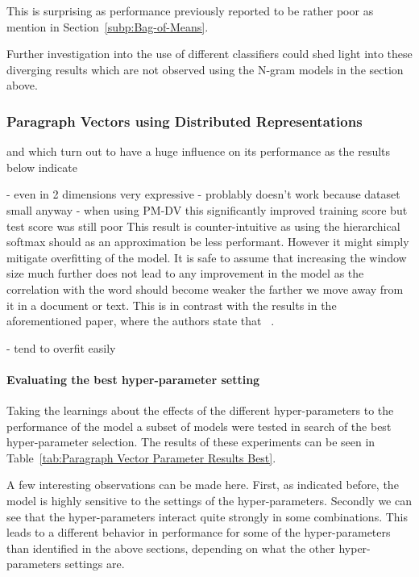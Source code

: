 This is surprising as performance previously reported to be rather poor as mention in Section~\ref{subp:Bag-of-Means}.

 Further investigation into the use of different classifiers could shed light into these diverging results which are not observed using the N-gram models in the section above.

\subsubsection{Paragraph Vectors using Distributed Representations}

and which turn out to have a huge influence on its performance as the results below indicate

- even in 2 dimensions very expressive
- problably doesn't work because dataset small anyway
- when using PM-DV this significantly improved training score but test score was still poor
This result is counter-intuitive as using the hierarchical softmax should as an approximation be less performant. However it might simply mitigate overfitting of the model.
It is safe to assume that increasing the window size much further does not lead to any improvement in the model as the correlation with the word should become weaker the farther we move away from it in a document or text.
This is in contrast with the results in the aforementioned paper, where the authors state that ~\cite{Le:2014aa}.

- tend to overfit easily




\paragraph{Evaluating the best hyper-parameter setting}

Taking the learnings about the effects of the different hyper-parameters to the performance of the model a subset of models were tested in search of the best hyper-parameter selection. The results of these experiments can be seen in Table~\ref{tab:Paragraph Vector Parameter Results Best}.

A few interesting observations can be made here. First, as indicated before, the model is highly sensitive to the settings of the hyper-parameters. Secondly we can see that the hyper-parameters interact quite strongly in some combinations. This leads to a different behavior in performance for some of the hyper-parameters than identified in the above sections, depending on what the other hyper-parameters settings are.

